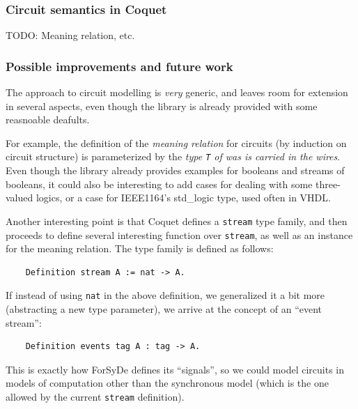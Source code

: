 \documentclass[a4paper]{article}
\begin{document}
            \subsubsection{Circuit semantics in Coquet}
            \label{subsub:coquet-semantics}
                TODO: Meaning relation, etc.


            \subsubsection{Possible improvements and future work}
            \label{subsubsec:coquet-improv}
                The approach to circuit modelling is \emph{very} generic, and leaves room for
                extension in several aspects, even though the library is already provided with some
                reasnoable deafults.

                For example, the definition of the \emph{meaning relation} for circuits (by
                induction on circuit structure) is parameterized by the \emph{type \texttt{T} of was
                    is carried in the wires}. Even though the library already provides examples for
                booleans and streams of booleans, it could also be interesting to add cases for
                dealing with some three-valued logics, or a case for IEEE1164's std\_logic type,
                used often in VHDL.

                Another interesting point is that Coquet defines a \texttt{stream} type family, and
                then proceeds to define several interesting function over \texttt{stream}, as well
                as an instance for the meaning relation. The type family is defined as follows:
                \begin{verbatim}
    Definition stream A := nat -> A.
                \end{verbatim}
                If instead of using \texttt{nat} in the above definition, we generalized it a bit
                more (abstracting a new type parameter), we arrive at the concept of an ``event
                stream'':
                \begin{verbatim}
    Definition events tag A : tag -> A.
                \end{verbatim}
                This is exactly how ForSyDe defines its ``signals'', so we could model circuits in
                models of computation other than the synchronous model (which is the one allowed by
                the current \texttt{stream} definition).
\end{document}
